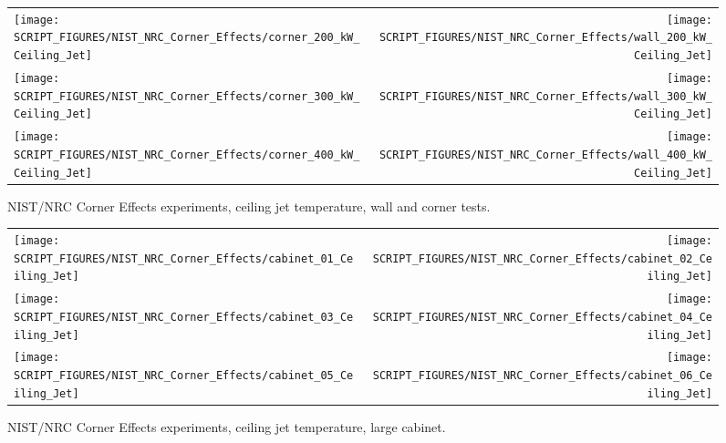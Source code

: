 \begin{figure}[p]
\begin{tabular*}{\textwidth}{l@{\extracolsep{\fill}}r}
\texttt{[image: SCRIPT\_FIGURES/NIST\_NRC\_Corner\_Effects/corner\_200\_kW\_Ceiling\_Jet]} &
\texttt{[image: SCRIPT\_FIGURES/NIST\_NRC\_Corner\_Effects/wall\_200\_kW\_Ceiling\_Jet]} \\
\texttt{[image: SCRIPT\_FIGURES/NIST\_NRC\_Corner\_Effects/corner\_300\_kW\_Ceiling\_Jet]} &
\texttt{[image: SCRIPT\_FIGURES/NIST\_NRC\_Corner\_Effects/wall\_300\_kW\_Ceiling\_Jet]} \\
\texttt{[image: SCRIPT\_FIGURES/NIST\_NRC\_Corner\_Effects/corner\_400\_kW\_Ceiling\_Jet]} &
\texttt{[image: SCRIPT\_FIGURES/NIST\_NRC\_Corner\_Effects/wall\_400\_kW\_Ceiling\_Jet]}
\end{tabular*}
\caption[NIST/NRC Corner Effects experiments, ceiling jet temperature]
{NIST/NRC Corner Effects experiments, ceiling jet temperature, wall and corner tests.}
\label{NIST_NRC_Corner_Ceiling_Jet_1}
\end{figure}

\begin{figure}[p]
\begin{tabular*}{\textwidth}{l@{\extracolsep{\fill}}r}
\texttt{[image: SCRIPT\_FIGURES/NIST\_NRC\_Corner\_Effects/cabinet\_01\_Ceiling\_Jet]} &
\texttt{[image: SCRIPT\_FIGURES/NIST\_NRC\_Corner\_Effects/cabinet\_02\_Ceiling\_Jet]} \\
\texttt{[image: SCRIPT\_FIGURES/NIST\_NRC\_Corner\_Effects/cabinet\_03\_Ceiling\_Jet]} &
\texttt{[image: SCRIPT\_FIGURES/NIST\_NRC\_Corner\_Effects/cabinet\_04\_Ceiling\_Jet]} \\
\texttt{[image: SCRIPT\_FIGURES/NIST\_NRC\_Corner\_Effects/cabinet\_05\_Ceiling\_Jet]} &
\texttt{[image: SCRIPT\_FIGURES/NIST\_NRC\_Corner\_Effects/cabinet\_06\_Ceiling\_Jet]}
\end{tabular*}
\caption[NIST/NRC Corner Effects experiments, ceiling jet temperature, large cabinet]
{NIST/NRC Corner Effects experiments, ceiling jet temperature, large cabinet.}
\label{NIST_NRC_Corner_Ceiling_Jet_2}
\end{figure}

